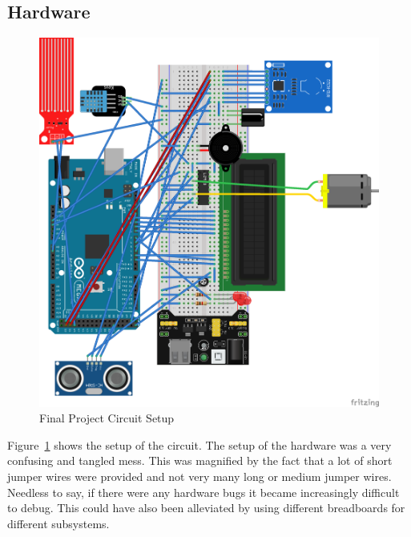 \documentclass[12pt,titlepage]{article}
\begin{document}
\subsection{Hardware}
\begin{figure}
  \centering
  \includegraphics[width=5in]{final_project/schematic.png}
  \caption{Final Project Circuit Setup}\label{fig:final_schem}
\end{figure}
Figure~\ref{fig:final_schem} shows the setup of the circuit. The setup of the hardware was a very confusing and tangled
mess. This was magnified by the fact that a lot of short jumper wires were provided and not very many long or medium jumper wires.
Needless to say, if there were any hardware bugs it became increasingly difficult to debug. This could have also been
alleviated by using different breadboards for different subsystems.
\end{document}
